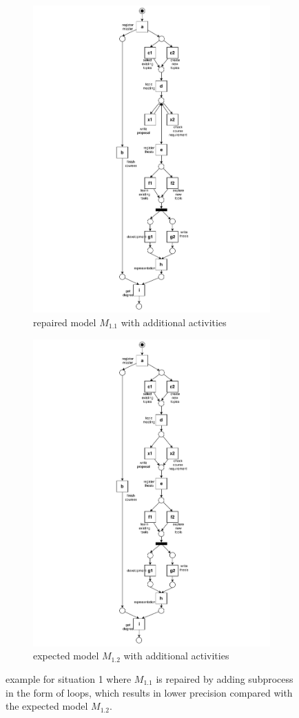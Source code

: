 \begin{figure}[htp]
	\centering
	\begin{subfigure}[b]{0.5\textwidth}
		\centering
		\includegraphics[clip, trim=7cm 0cm 7cm 0cm, width=0.5\linewidth, height=0.7\textheight]{figures/introduction/Master-add-events-loop.pdf}
		\caption{repaired model $M_{1.1}$ with additional activities }
		\label{fig:model_b1}
	\end{subfigure}%
	\begin{subfigure}[b]{0.5\textwidth}
		\centering
		\includegraphics[clip, trim=7cm 0cm 7cm 0cm, width=0.5\linewidth, height=0.7\textheight]{figures/introduction/Master-add-events.pdf}
		\caption{expected model $M_{1.2}$ with additional activities}
		\label{fig:model_b2}
	\end{subfigure}
	\caption{example for situation 1 where $M_{1.1}$ is repaired by adding subprocess in the form of loops, which results in lower precision compared with the expected model $M_{1.2}$.}
	\label{fig:model_change_1}
\end{figure}

